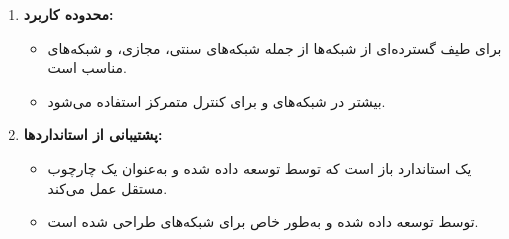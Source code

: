 \begin{qsolve}
\begin{enumerate}
		\item \textbf{محدوده کاربرد:}
		\begin{itemize}
			\item {} برای طیف گسترده‌ای از شبکه‌ها از جمله شبکه‌های سنتی، مجازی، و شبکه‌های  مناسب است.
			\item {} بیشتر در شبکه‌های  و برای کنترل متمرکز استفاده می‌شود.
		\end{itemize}
		
		\item \textbf{پشتیبانی از استانداردها:}
		\begin{itemize}
			\item {} یک استاندارد باز است که توسط  توسعه داده شده و به‌عنوان یک چارچوب مستقل عمل می‌کند.
			\item {} توسط  توسعه داده شده و به‌طور خاص برای شبکه‌های  طراحی شده است.
		\end{itemize}
	\end{enumerate}
\end{qsolve}